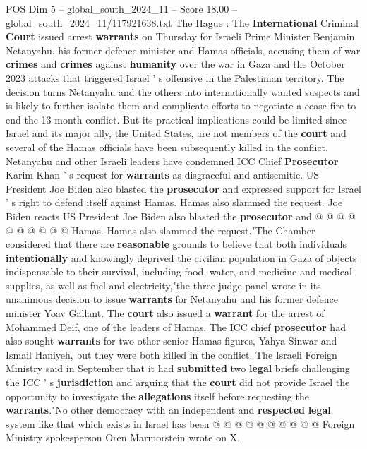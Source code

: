 \begin{textsample}{POS Dim 5 – global\_south\_2024\_11 – Score 18.00 – global\_south\_2024\_11/117921638.txt}  \label{ex:f5_pos_029}
The Hague : The \textbf{International} Criminal \textbf{Court} issued arrest \textbf{warrants} on Thursday for Israeli Prime Minister Benjamin Netanyahu, his former defence minister and Hamas officials, accusing them of war \textbf{crimes} and \textbf{crimes} against \textbf{humanity} over the war in Gaza and the October 2023 attacks that triggered Israel ' s offensive in the Palestinian territory.
The decision turns Netanyahu and the others into internationally wanted suspects and is likely to further isolate them and complicate efforts to negotiate a cease-fire to end the 13-month conflict.
But its practical implications could be limited since Israel and its major ally, the United States, are not members of the \textbf{court} and several of the Hamas officials have been subsequently killed in the conflict.
Netanyahu and other Israeli leaders have condemned ICC Chief \textbf{Prosecutor} Karim Khan ' s request for \textbf{warrants} as disgraceful and antisemitic.
US President Joe Biden also blasted the \textbf{prosecutor} and expressed support for Israel ' s right to defend itself against Hamas.
Hamas also slammed the request.
Joe Biden reacts US President Joe Biden also blasted the \textbf{prosecutor} and @ @ @ @ @ @ @ @ @ @ Hamas.
Hamas also slammed the request."The Chamber considered that there are \textbf{reasonable} grounds to believe that both individuals \textbf{intentionally} and knowingly deprived the civilian population in Gaza of objects indispensable to their survival, including food, water, and medicine and medical supplies, as well as fuel and electricity,"the three-judge panel wrote in its unanimous decision to issue \textbf{warrants} for Netanyahu and his former defence minister Yoav Gallant.
The \textbf{court} also issued a \textbf{warrant} for the arrest of Mohammed Deif, one of the leaders of Hamas.
The ICC chief \textbf{prosecutor} had also sought \textbf{warrants} for two other senior Hamas figures, Yahya Sinwar and Ismail Haniyeh, but they were both killed in the conflict.
The Israeli Foreign Ministry said in September that it had \textbf{submitted} two \textbf{legal} briefs challenging the ICC ' s \textbf{jurisdiction} and arguing that the \textbf{court} did not provide Israel the opportunity to investigate the \textbf{allegations} itself before requesting the \textbf{warrants}."No other democracy with an independent and \textbf{respected} \textbf{legal} system like that which exists in Israel has been @ @ @ @ @ @ @ @ @ @ Foreign Ministry spokesperson Oren Marmorstein wrote on X.

\end{textsample}
